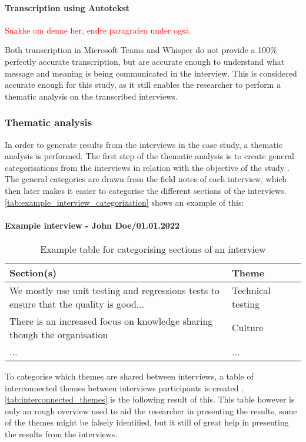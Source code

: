 \paragraph{Transcription using Autotekst}
\textcolor{red}{Snakke om denne her, endre paragrafen under også}

Both transcription in Microsoft Teams and Whisper do not provide a 100\% perfectly accurate transcription, but are accurate enough to understand what message and meaning is being communicated in the interview. This is considered accurate enough for this study, as it still enables the researcher to perform a thematic analysis on the transcribed interviews.

\subsubsection{Thematic analysis}
In order to generate results from the interviews in the case study, a thematic analysis is performed. The first step of the thematic analysis is to create general categorisations from the interviews in relation with the objective of the study \cite{bjo_2022}. The general categories are drawn from the field notes of each interview, which then later makes it easier to categorise the different sections of the interviews. \autoref{tab:example_interview_categorization} shows an example of this:

\paragraph{Example interview - John Doe/01.01.2022} \hspace{0cm}

\begin{table}[h]
\begin{tabular}{|p{0.75\linewidth}|p{0.25\linewidth}|}
\hline
\textbf{Section(s)} & \textbf{Theme} \\ \hline
We mostly use unit testing and regressions tests to ensure that the quality is good... & Technical testing \\ \hline
There is an increased focus on knowledge sharing though the organisation & Culture \\ \hline
... & ... \\ \hline
\end{tabular}
\caption{Example table for categorising sections of an interview}
\label{tab:example_interview_categorization}
\end{table}

To categorise which themes are shared between interviews, a table of interconnected themes between interviews participants is created \cite{bjo_2022}. \autoref{tab:interconnected_themes} is the following result of this. This table however is only an rough overview used to aid the researcher in presenting the results, some of the themes might be falsely identified, but it still of great help in presenting the results from the interviews.

